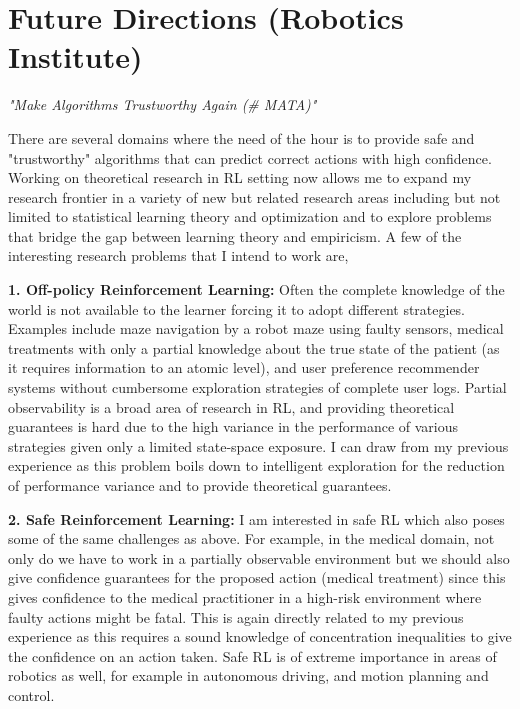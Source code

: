 \documentclass{article}
\begin{document}
\vspace*{-2em}
\section{Future Directions (Robotics Institute)} 
\vspace*{-1em}

\begin{center} \textit{"Make Algorithms Trustworthy Again (\# MATA)"}\end{center}

There are several domains where the need of the hour is to provide safe and "trustworthy" algorithms that can predict correct actions with high confidence. Working on theoretical research in RL setting now allows me to expand my research frontier in a variety of new but related research areas including but not limited to statistical learning theory and optimization and to explore problems that bridge the gap between learning theory and empiricism. A few of the interesting research problems
that I intend to work are,

\textbf{1. Off-policy Reinforcement Learning:} Often the complete knowledge of the world is not available to the learner forcing it to adopt different strategies. Examples include maze navigation by a robot maze using faulty sensors, medical treatments with only a partial knowledge about the true state of the patient (as it requires information to
an atomic level), and user preference recommender systems without cumbersome exploration strategies of complete user logs. Partial observability is a broad area of research in RL, and providing theoretical guarantees is hard due to the high variance in the performance of various strategies given only a limited state-space exposure. I can draw from my previous experience as this problem boils down to intelligent exploration for the reduction of performance variance and to provide theoretical guarantees.


\textbf{2. Safe Reinforcement Learning:} I am interested in safe RL which also poses some of the same challenges as above. For example, in the medical domain, not only do we have to work in a partially observable environment but we should also give confidence guarantees for the proposed action (medical treatment) since this gives confidence to the medical
practitioner in a high-risk environment where faulty actions might be fatal. This is again directly related to my previous experience as this requires a sound knowledge of concentration inequalities to give the confidence on an action taken. Safe RL is of extreme importance in areas of robotics as well, for example in autonomous driving,
and motion planning and control.
\end{document}
